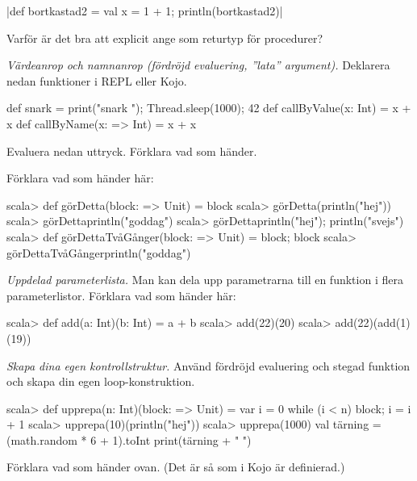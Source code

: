 \Subtask {}

\Subtask {}

\Subtask {}

\Subtask {}

\Subtask {}

\Subtask \code|def bortkastad2 = {val x = 1 + 1}; println(bortkastad2)|

\Subtask\Pen Varför är det bra att explicit ange  som returtyp för procedurer?


\Task \emph{Värdeanrop och namnanrop (fördröjd evaluering, ''lata'' argument).} Deklarera nedan funktioner i REPL eller Kojo.

\begin{Code}
def snark = {print("snark "); Thread.sleep(1000); 42}
def callByValue(x: Int) = x + x
def callByName(x: => Int) = x + x
\end{Code}

Evaluera nedan uttryck. Förklara vad som händer.

\Subtask {}

\Subtask {}

\Subtask {}

\Subtask {}

\Subtask {}

\Subtask {}


\Subtask Förklara vad som händer här:
\begin{REPL}
scala> def görDetta(block: => Unit) = block
scala> görDetta(println("hej"))
scala> görDetta{println("goddag")}
scala> görDetta{println("hej"); println("svejs")}
scala> def görDettaTvåGånger(block: => Unit) = {block; block}
scala> görDettaTvåGånger{println("goddag")}
\end{REPL}


\Task \emph{Uppdelad parameterlista.} Man kan dela upp parametrarna till en funktion i flera parameterlistor. Förklara vad som händer här:
\begin{REPL}
scala> def add(a: Int)(b: Int) = a + b
scala> add(22)(20)
scala> add(22)(add(1)(19))
\end{REPL}


\Task \emph{Skapa dina egen kontrollstruktur.} Använd fördröjd evaluering och stegad funktion och skapa din egen loop-konstruktion.
\begin{REPL}
scala> def upprepa(n: Int)(block: => Unit) = {
         var i = 0
         while (i < n) {block; i = i + 1}
       }
scala> upprepa(10)(println("hej"))
scala> upprepa(1000){
  val tärning = (math.random * 6 + 1).toInt
  print(tärning + " ")
}
\end{REPL}
Förklara vad som händer ovan. (Det är så som  i Kojo är definierad.)


